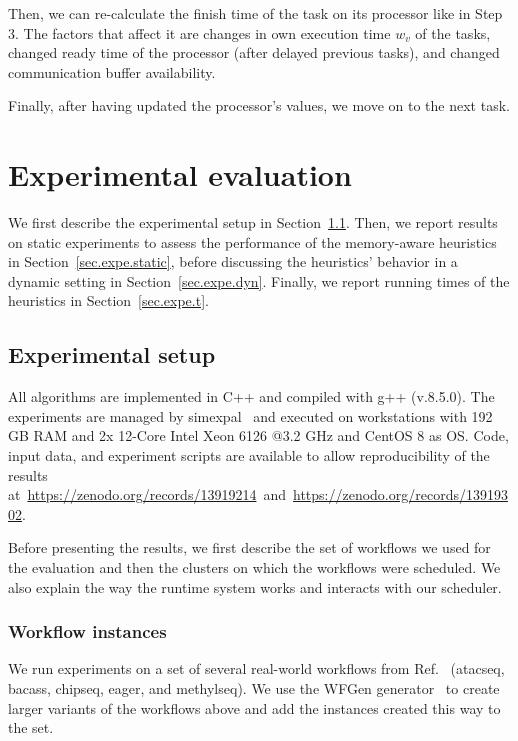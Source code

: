 \documentclass[conference]{IEEEtran}
\newcommand{\hmey}[1]{{\color{red}[HM: #1]}}
\begin{document}
Then, we can re-calculate the finish time of the task on its processor like in Step 3.
The factors that affect it are changes in own execution time $w_v$ of the tasks, changed ready time of the processor
(after delayed previous tasks), and changed communication buffer availability.

Finally, after having updated the processor's values, we move on to the next task.





\section{Experimental evaluation}
\label{sec:expe}
%
We first describe the experimental setup in Section~\ref{sec:setup}. 
Then, we report results on static experiments to assess the performance
of the memory-aware heuristics in Section~\ref{sec.expe.static}, before
discussing the heuristics' behavior in a dynamic setting in Section~\ref{sec.expe.dyn}. 
Finally, we report running times of the heuristics in Section~\ref{sec.expe.t}. 

\subsection{Experimental setup}
\label{sec:setup}
%
All algorithms are implemented in C++ and compiled with g++ (v.8.5.0).
The experiments are managed by simexpal~\cite{DBLP:journals/algorithms/AngrimanGLMNPT19} and executed on workstations with 192 GB RAM and 2x 12-Core Intel Xeon 6126 @3.2 GHz
and CentOS 8 as OS.
Code, input data, and experiment scripts are available to allow reproducibility of the results at~\url{https://zenodo.org/records/13919214}~and~\url{https://zenodo.org/records/13919302}.

Before presenting the results, we first describe the set of workflows we used for the evaluation and
then the clusters on which the workflows were scheduled.
We also explain the way the runtime system works and interacts with our scheduler. 

\subsubsection{Workflow instances}
We run experiments on a set of several real-world workflows from Ref.~\cite{lotaru}
(atacseq, bacass, chipseq, eager, and methylseq). We use the WFGen generator~\cite{COLEMAN202216} to
create larger variants of the workflows above and add the instances created this way to the set.
\end{document}
